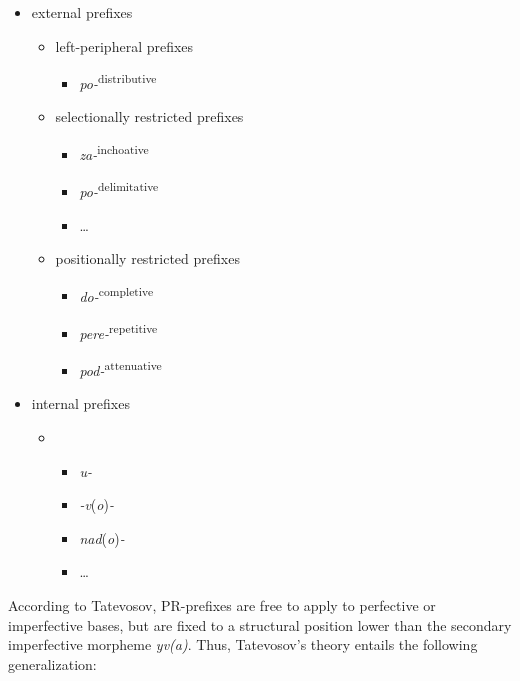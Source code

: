 \documentclass[output=paper,
colorlinks,
citecolor=brown,
newtxmath
]{langscibook}
\begin{document}
\ea\label{tatprefs}
\begin{itemize}
\item[] external prefixes
    \begin{itemize}
    \item[] left-peripheral prefixes
        \begin{itemize}
        \item[] \textit{po-}\textsuperscript{distributive}
        \end{itemize}
    \item[] selectionally restricted prefixes
        \begin{itemize}
        \item[] \textit{za-}\textsuperscript{inchoative}
        \item[] \textit{po-}\textsuperscript{delimitative}
        \item[] {\dots}
        \end{itemize}
    \item[] positionally restricted prefixes
        \begin{itemize}
        \item[] \textit{do-}\textsuperscript{completive}
        \item[] \textit{pere-}\textsuperscript{repetitive}
        \item[] \textit{pod-}\textsuperscript{attenuative}
        \end{itemize}
\end{itemize}
\item[] internal prefixes
        \begin{itemize}
        \item[]
            \begin{itemize}
            \item[] \textit{u-}
            \item[] \textit{-v}(\textit{o})\textit{-}
            \item[] \textit{nad}(\textit{o})\textit{-}
            \item[] {\dots}
            \end{itemize}
        \end{itemize}
\end{itemize}
\z

\noindent According to Tatevosov, PR-prefixes are free to apply to perfective or imperfective bases, but are fixed to a structural position lower than the secondary imperfective morpheme \textit{yv(a)}. Thus, Tatevosov's theory entails the following generalization:
\end{document}
